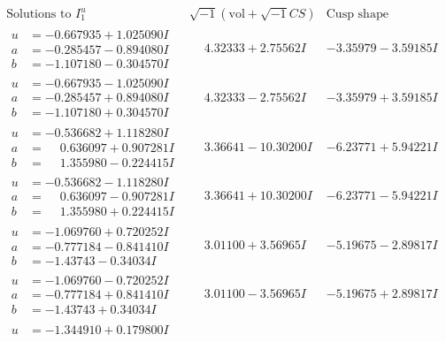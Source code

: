 \documentclass[1p]{elsarticle_modified}
\theoremstyle{definition}
\newcommand{\I}{\sqrt{-1}}
\begin{document}
$$\begin{array}{c|c|c}  
\text{Solutions to }I^u_{1}& \I (\text{vol} + \sqrt{-1}CS) & \text{Cusp shape}\\
 \hline 
\begin{aligned}
u &= -0.667935 + 1.025090 I \\
a &= -0.285457 - 0.894080 I \\
b &= -1.107180 - 0.304570 I\end{aligned}
 & \phantom{-}4.32333 + 2.75562 I & -3.35979 - 3.59185 I \\ \hline\begin{aligned}
u &= -0.667935 - 1.025090 I \\
a &= -0.285457 + 0.894080 I \\
b &= -1.107180 + 0.304570 I\end{aligned}
 & \phantom{-}4.32333 - 2.75562 I & -3.35979 + 3.59185 I \\ \hline\begin{aligned}
u &= -0.536682 + 1.118280 I \\
a &= \phantom{-}0.636097 + 0.907281 I \\
b &= \phantom{-}1.355980 - 0.224415 I\end{aligned}
 & \phantom{-}3.36641 - 10.30200 I & -6.23771 + 5.94221 I \\ \hline\begin{aligned}
u &= -0.536682 - 1.118280 I \\
a &= \phantom{-}0.636097 - 0.907281 I \\
b &= \phantom{-}1.355980 + 0.224415 I\end{aligned}
 & \phantom{-}3.36641 + 10.30200 I & -6.23771 - 5.94221 I \\ \hline\begin{aligned}
u &= -1.069760 + 0.720252 I \\
a &= -0.777184 - 0.841410 I \\
b &= -1.43743 - 0.34034 I\end{aligned}
 & \phantom{-}3.01100 + 3.56965 I & -5.19675 - 2.89817 I \\ \hline\begin{aligned}
u &= -1.069760 - 0.720252 I \\
a &= -0.777184 + 0.841410 I \\
b &= -1.43743 + 0.34034 I\end{aligned}
 & \phantom{-}3.01100 - 3.56965 I & -5.19675 + 2.89817 I \\ \hline\begin{aligned}
u &= -1.344910 + 0.179800 I \\

\end{aligned}
\end{array}$$
\end{document}
